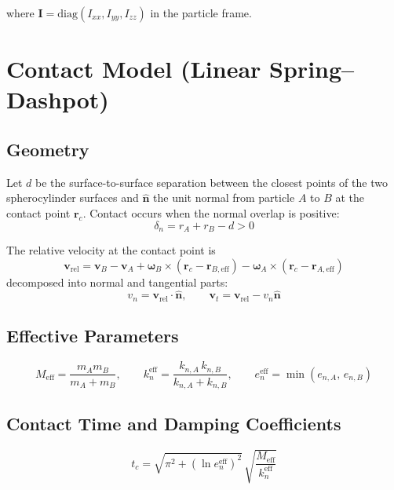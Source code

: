 \documentclass[12pt]{article}
\newcommand{\bs}[1]{\boldsymbol{#1}}
\begin{document}
where $\bs{I} = \mathrm{diag}(I_{xx}, I_{yy}, I_{zz})$ in the particle frame.

\section{Contact Model (Linear Spring--Dashpot)}

\subsection{Geometry}

Let $d$ be the surface-to-surface separation between the closest points of the
two spherocylinder surfaces and $\hat{\bs{n}}$ the unit normal from particle
$A$ to $B$ at the contact point $\bs{r}_c$.  Contact occurs when the normal
overlap is positive:
\begin{equation}
  \delta_n = r_A + r_B - d > 0
\end{equation}

The relative velocity at the contact point is
\begin{equation}
  \bs{v}_\text{rel} = \bs{v}_B - \bs{v}_A
    + \bs{\omega}_B \times (\bs{r}_c - \bs{r}_{B,\text{eff}})
    - \bs{\omega}_A \times (\bs{r}_c - \bs{r}_{A,\text{eff}})
\end{equation}
decomposed into normal and tangential parts:
\begin{equation}
  v_n = \bs{v}_\text{rel}\cdot\hat{\bs{n}}, \qquad
  \bs{v}_t = \bs{v}_\text{rel} - v_n\hat{\bs{n}}
\end{equation}

\subsection{Effective Parameters}

\begin{equation}
  M_\text{eff} = \frac{m_A m_B}{m_A + m_B}, \qquad
  k_n^\text{eff} = \frac{k_{n,A}\, k_{n,B}}{k_{n,A} + k_{n,B}}, \qquad
  e_n^\text{eff} = \min(e_{n,A},\, e_{n,B})
\end{equation}

\subsection{Contact Time and Damping Coefficients}

\begin{equation}
  t_c = \sqrt{\pi^2 + (\ln e_n^\text{eff})^2}\,
        \sqrt{\frac{M_\text{eff}}{k_n^\text{eff}}}
\end{equation}
\end{document}
